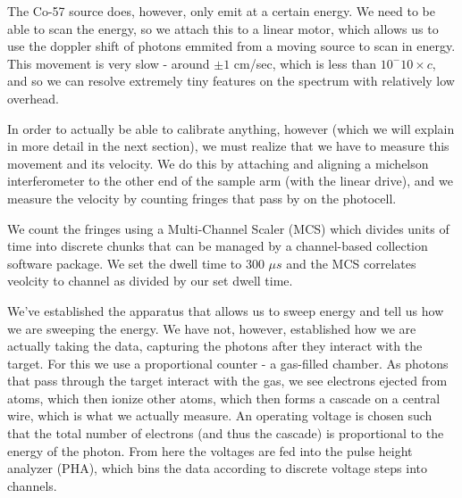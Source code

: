 \documentclass[reprint, nobibnotes, amssymb, amsmath, amsfonts, mathtools, mathrsfs, floatfix]{revtex4-1}
\begin{document}
      The Co-57 source does, however, only emit at a certain energy.  We need to be able to scan the energy, so we attach this to a linear motor, which allows us to use the doppler shift of photons emmited from a moving source to scan in energy.  This movement is very slow - around $\pm1$ cm/sec, which is less than $10^-10 \times c$, and so we can resolve extremely tiny features on the spectrum with relatively low overhead.

      In order to actually be able to calibrate anything, however (which we will explain in more detail in the next section), we must realize that we have to measure this movement and its velocity.  We do this by attaching and aligning a michelson interferometer to the other end of the sample arm (with the linear drive), and we measure the velocity by counting fringes that pass by on the photocell.

      We count the fringes using a Multi-Channel Scaler (MCS) which divides units of time into discrete chunks that can be managed by a channel-based collection software package.  We set the dwell time to 300 $\mu s$ and the MCS correlates veolcity to channel as divided by our set dwell time.

      We've established the apparatus that allows us to sweep energy and tell us how we are sweeping the energy.  We have not, however, established how we are actually taking the data, capturing the photons after they interact with the target.  For this we use a proportional counter - a gas-filled chamber.  As photons that pass through the target interact with the gas, we see electrons ejected from atoms, which then ionize other atoms, which then forms a cascade on a central wire, which is what we actually measure.  An operating voltage is chosen such that the total number of electrons (and thus the cascade) is proportional to the energy of the photon.  From here the voltages are fed into the pulse height analyzer (PHA), which bins the data according to discrete voltage steps into channels.
\end{document}
